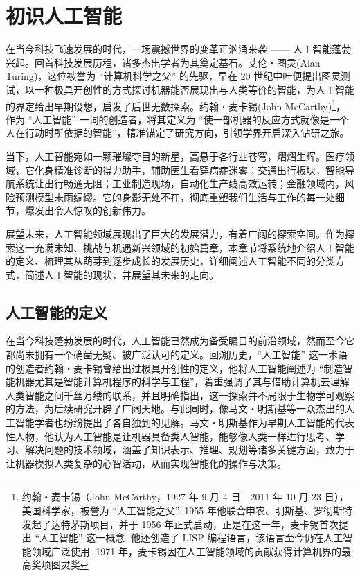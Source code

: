 \chapter{初识人工智能}


在当今科技飞速发展的时代，一场震撼世界的变革正汹涌来袭 —— 人工智能蓬勃兴起。回首科技发展历程，诸多杰出学者为其奠定基石。艾伦・图灵(Alan Turing)，这位被誉为 “计算机科学之父” 的先驱，早在 20 世纪中叶便提出图灵测试，以一种极具开创性的方式探讨机器能否展现出与人类等价的智能，为人工智能的界定给出早期设想，启发了后世无数探索。约翰・麦卡锡(John McCarthy)\footnote{约翰・麦卡锡（John McCarthy，1927 年 9 月 4 日 - 2011 年 10 月 23 日），美国科学家，被誉为 “人工智能之父”. 1955 年他联合申农、明斯基、罗彻斯特发起了达特茅斯项目，并于 1956 年正式启动，正是在这一年，麦卡锡首次提出 “人工智能” 这一概念. 他还创造了 LISP 编程语言，该语言至今仍在人工智能领域广泛使用. 1971 年，麦卡锡因在人工智能领域的贡献获得计算机界的最高奖项图灵奖}，作为 “人工智能” 一词的创造者，将其定义为 “使一部机器的反应方式就像是一个人在行动时所依据的智能”，精准锚定了研究方向，引领学界开启深入钻研之旅。

当下，人工智能宛如一颗璀璨夺目的新星，高悬于各行业苍穹，熠熠生辉。医疗领域，它化身精准诊断的得力助手，辅助医生看穿病症迷雾；交通出行板块，智能导航系统让出行畅通无阻；工业制造现场，自动化生产线高效运转；金融领域内，风险预测模型未雨绸缪。它的身影无处不在，彻底重塑我们生活与工作的每一处细节，爆发出令人惊叹的创新伟力。


展望未来，人工智能领域展现出了巨大的发展潜力，有着广阔的探索空间。作为探索这一充满未知、挑战与机遇新兴领域的初始篇章，本章节将系统地介绍人工智能的定义、梳理其从萌芽到逐步成长的发展历史，详细阐述人工智能不同的分类方式，简述人工智能的现状，并展望其未来的走向。

\section{人工智能的定义}
在当今科技蓬勃发展的时代，人工智能已然成为备受瞩目的前沿领域，然而至今它都尚未拥有一个确凿无疑、被广泛认可的定义。回溯历史，“人工智能” 这一术语的创造者约翰・麦卡锡曾给出过极具开创性的定义，他将人工智能阐述为 “制造智能机器尤其是智能计算机程序的科学与工程”，着重强调了其与借助计算机去理解人类智能之间千丝万缕的联系，并且明确指出，这一探索并不局限于生物学可观察的方法，为后续研究开辟了广阔天地。与此同时，像马文・明斯基等一众杰出的人工智能学者也纷纷提出了各自独到的见解。马文・明斯基作为早期人工智能的代表性人物，他认为人工智能是让机器具备类人智能，能够像人类一样进行思考、学习、解决问题的技术领域，涵盖了知识表示、推理、规划等诸多关键方面，致力于让机器模拟人类复杂的心智活动，从而实现智能化的操作与决策。


